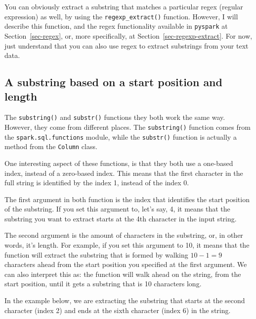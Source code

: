 \documentclass[
  11pt,
  letterpaper,
  DIV=11,
  numbers=noendperiod]{scrreprt}
\begin{document}
You can obviously extract a substring that matches a particular regex
(regular expression) as well, by using the \texttt{regexp\_extract()}
function. However, I will describe this function, and the regex
functionality available in \texttt{pyspark} at Section~\ref{sec-regex},
or, more specifically, at Section~\ref{sec-regexp-extract}. For now,
just understand that you can also use regex to extract substrings from
your text data.

\subsection{A substring based on a start position and
length}\label{a-substring-based-on-a-start-position-and-length}

The \texttt{substring()} and \texttt{substr()} functions they both work
the same way. However, they come from different places. The
\texttt{substring()} function comes from the
\texttt{spark.sql.functions} module, while the \texttt{substr()}
function is actually a method from the \texttt{Column} class.

One interesting aspect of these functions, is that they both use a
one-based index, instead of a zero-based index. This means that the
first character in the full string is identified by the index 1, instead
of the index 0.

The first argument in both function is the index that identifies the
start position of the substring. If you set this argument to, let's say,
4, it means that the substring you want to extract starts at the 4th
character in the input string.

The second argument is the amount of characters in the substring, or, in
other words, it's length. For example, if you set this argument to 10,
it means that the function will extract the substring that is formed by
walking \(10 - 1 = 9\) characters ahead from the start position you
specified at the first argument. We can also interpret this as: the
function will walk ahead on the string, from the start position, until
it gets a substring that is 10 characters long.

In the example below, we are extracting the substring that starts at the
second character (index 2) and ends at the sixth character (index 6) in
the string.
\end{document}
